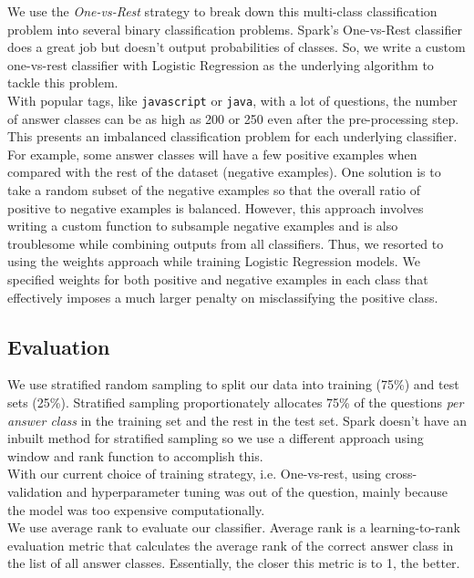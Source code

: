 \documentclass{article}
\begin{document}
We use the \textit{One-vs-Rest} strategy to break down this multi-class classification problem into several binary classification problems. Spark's One-vs-Rest classifier does a great job but doesn't output probabilities of classes. So, we write a custom one-vs-rest classifier with Logistic Regression as the underlying algorithm to tackle this problem.\\

With popular tags, like \texttt{javascript} or \texttt{java}, with a lot of questions, the number of answer classes can be as high as 200 or 250 even after the pre-processing step. This presents an imbalanced classification problem for each underlying classifier. For example, some answer classes will have a few positive examples when compared with the rest of the dataset (negative examples). One solution is to take a random subset of the negative examples so that the overall ratio of positive to negative examples is balanced. However, this approach involves writing a custom function to subsample negative examples and is also troublesome while combining outputs from all classifiers. Thus, we resorted to using the weights approach while training Logistic Regression models. We specified weights for both positive and negative examples in each class that effectively imposes a much larger penalty on misclassifying the positive class.

\subsection{Evaluation}
We use stratified random sampling to split our data into training (75\%) and test sets (25\%). Stratified sampling proportionately allocates 75\% of the questions \textit{per answer class} in the training set and the rest in the test set. Spark doesn't have an inbuilt method for stratified sampling so we use a different approach using window and rank function to accomplish this.\\

With our current choice of training strategy, i.e. One-vs-rest, using cross-validation and hyperparameter tuning was out of the question, mainly because the model was too expensive computationally.\\

We use average rank to evaluate our classifier. Average rank is a learning-to-rank evaluation metric that calculates the average rank of the correct answer class in the list of all answer classes. Essentially, the closer this metric is to 1, the better.
\end{document}
